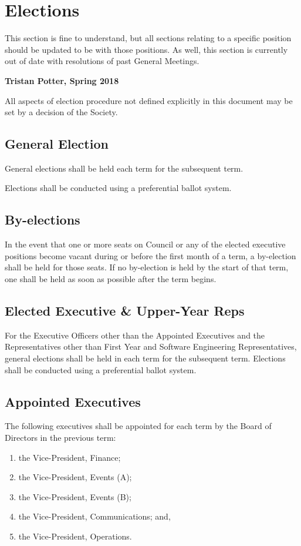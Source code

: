 \section{Elections}
\begin{annotation}
    This section is fine to understand, but all sections relating to a specific
    position should be updated to be with those positions. As well, this 
    section is currently out of date with resolutions of past General Meetings.
    
    \textbf{Tristan Potter, Spring 2018}
\end{annotation}

All aspects of election procedure not defined explicitly in this document may be
set by a decision of the Society.

\subsection{General Election}
General elections shall be held each term for the subsequent term.

Elections shall be conducted using a preferential ballot system.

\subsection{By-elections}
In the event that one or more seats on Council or any of the elected executive
positions become vacant during or before the first month of a term, a by-election shall be held for those seats. If no by-election is held by the start of that
term, one shall be held as soon as possible after the term begins.

\subsection{Elected Executive \& Upper-Year Reps}
For the Executive Officers other than the Appointed Executives and the
Representatives other than First Year and Software Engineering Representatives,
general elections shall be held in each term for the subsequent term. Elections shall be conducted using a preferential ballot system.

\subsection{Appointed Executives}
The following executives shall be appointed for each term by the Board
of Directors in the previous term:
\begin{enumerate} 
    \item the Vice-President, Finance;
    \item the Vice-President, Events (A);
    \item the Vice-President, Events (B);
    \item the Vice-President, Communications; and,
    \item the Vice-President, Operations.
\end{enumerate}

